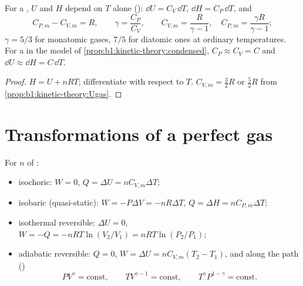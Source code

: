 \begin{proposition}\label{prop:b1:first-law:gas}
For a , $U$ and $H$ depend on $T$ alone ():
$\dd U = C_V\,\dd T$, $\dd H = C_P\,\dd T$, and
\[
C_{P,m} - C_{V,m} = R, \qquad \gamma = \frac{C_P}{C_V}, \qquad
C_{V,m} = \frac{R}{\gamma - 1}, \quad C_{P,m} = \frac{\gamma R}{\gamma - 1} ;
\]
$\gamma = 5/3$ for monatomic gases, $7/5$ for diatomic ones at ordinary
temperatures. For a  in the model of
\cref{prop:b1:kinetic-theory:condensed}, $C_P \approx C_V = C$ and
$\dd U \approx \dd H = C\,\dd T$.
\end{proposition}

\begin{proof}
$H = U + nRT$; differentiate with respect to $T$. $C_{V,m} = \tfrac32 R$ or
$\tfrac52 R$ from \cref{prop:b1:kinetic-theory:Ugas}.
\end{proof}

\section{Transformations of a perfect gas}

\begin{proposition}\label{prop:b1:first-law:transformations}
For $n$  of :
\begin{itemize}
  \item isochoric: $W = 0$, $Q = \Delta U = nC_{V,m}\Delta T$;
  \item isobaric (quasi-static): $W = -P\Delta V = -nR\Delta T$, $Q = \Delta H =
        nC_{P,m}\Delta T$;
  \item isothermal reversible: $\Delta U = 0$, $W = -Q = -nRT\ln(V_2/V_1) =
        nRT\ln(P_2/P_1)$;
  \item adiabatic reversible: $Q = 0$, $W = \Delta U = nC_{V,m}(T_2 - T_1)$,
        and along the path (\emph{})
        \[
        PV^\gamma = \text{const}, \qquad TV^{\gamma - 1} = \text{const}, \qquad
        T^\gamma P^{1 - \gamma} = \text{const} .
        \]
\end{itemize}
\end{proposition}

